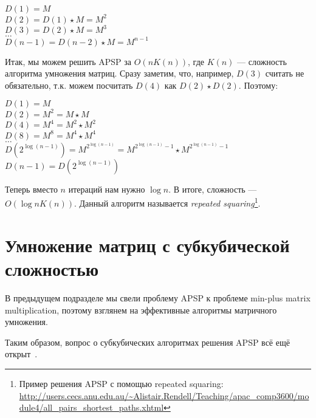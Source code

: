 \begin{center}
    $D(1) = M$ \\
    $D(2) = D(1) \star M = M^2$ \\
    $D(3) = D(2) \star M = M^3$ \\
    $\dots$ \\
    $D(n-1) = D(n-2) \star M = M^{n-1}$ \\
\end{center}

Итак, мы можем решить APSP за $O(n K(n))$, где $K(n)$ --- сложность алгоритма умножения матриц.
Сразу заметим, что, например, $D(3)$ считать не обязательно, т.к. можем посчитать $D(4)$ как $D(2) \star D(2)$.
Поэтому:

\begin{center}
    $D(1) = M$ \\
    $D(2) = M^2 = M \star M$ \\
    $D(4) = M^4 = M^2 \star M^2$ \\
    $D(8) = M^8 = M^4 \star M^4$ \\
    $\dots$ \\
    $D(2^{\log(n-1)}) = M^{2^{\log(n-1)}} = M^{2^{\log(n-1)} - 1} \star M^{2^{\log(n-1)} - 1}$ \\
    $D(n-1) = D(2^{\log(n-1)})$ \\
\end{center}

Теперь вместо $n$ итераций нам нужно $\log{n}$. В итоге, сложность --- $O(\log{n} K(n))$.
Данный алгоритм называется \textit{repeated squaring}\footnote{Пример решения APSP с помощью repeated squaring: \url{http://users.cecs.anu.edu.au/~Alistair.Rendell/Teaching/apac_comp3600/module4/all_pairs_shortest_paths.xhtml}}.

\section{Умножение матриц с субкубической сложностью}
В предыдущем подразделе мы свели проблему APSP к проблеме min-plus matrix multiplication, поэтому взглянем на эффективные алгоритмы матричного умножения.

Таким образом, вопрос о субкубических алгоритмах решения APSP всё ещё открыт~\cite{Chan2010}.


